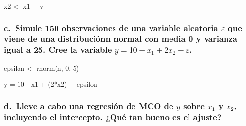 \documentclass[
]{article}
\newenvironment{Shaded}{\begin{snugshade}}{\end{snugshade}}
\newcommand{\DecValTok}[1]{\textcolor[rgb]{0.00,0.00,0.81}{#1}}
\newcommand{\FunctionTok}[1]{\textcolor[rgb]{0.00,0.00,0.00}{#1}}
\newcommand{\NormalTok}[1]{#1}
\newcommand{\OtherTok}[1]{\textcolor[rgb]{0.56,0.35,0.01}{#1}}
\newcommand{\SpecialCharTok}[1]{\textcolor[rgb]{0.00,0.00,0.00}{#1}}
\begin{document}
\begin{Shaded}
\begin{Highlighting}[]
\NormalTok{x2 }\OtherTok{\textless{}{-}}\NormalTok{ x1 }\SpecialCharTok{+}\NormalTok{ v}
\end{Highlighting}
\end{Shaded}

\hypertarget{c.-simule-150-observaciones-de-una-variable-aleatoria-varepsilon-que-viene-de-una-distribuciuxf3nn-normal-con-media-0-y-varianza-igual-a-25.-cree-la-variable-y-10-x_1-2x_2-varepsilon.}{%
\subsubsection{\texorpdfstring{c.~Simule 150 observaciones de una
variable aleatoria \(\varepsilon\) que viene de una distribuciónn normal
con media 0 y varianza igual a 25. Cree la variable
\(y = 10 − x_{1} + 2x_{2} + \varepsilon\).}{c.~Simule 150 observaciones de una variable aleatoria \textbackslash varepsilon que viene de una distribuciónn normal con media 0 y varianza igual a 25. Cree la variable y = 10 − x\_\{1\} + 2x\_\{2\} + \textbackslash varepsilon.}}\label{c.-simule-150-observaciones-de-una-variable-aleatoria-varepsilon-que-viene-de-una-distribuciuxf3nn-normal-con-media-0-y-varianza-igual-a-25.-cree-la-variable-y-10-x_1-2x_2-varepsilon.}}

\begin{Shaded}
\begin{Highlighting}[]
\NormalTok{epsilon }\OtherTok{\textless{}{-}} \FunctionTok{rnorm}\NormalTok{(n, }\DecValTok{0}\NormalTok{, }\DecValTok{5}\NormalTok{)}

\NormalTok{y }\OtherTok{=} \DecValTok{10} \SpecialCharTok{{-}}\NormalTok{ x1 }\SpecialCharTok{+}\NormalTok{ (}\DecValTok{2}\SpecialCharTok{*}\NormalTok{x2) }\SpecialCharTok{+}\NormalTok{ epsilon}
\end{Highlighting}
\end{Shaded}

\hypertarget{d.-lleve-a-cabo-una-regresiuxf3n-de-mco-de-y-sobre-x_1-y-x_2-incluyendo-el-intercepto.-quuxe9-tan-bueno-es-el-ajuste}{%
\subsubsection{\texorpdfstring{d.~Lleve a cabo una regresión de MCO de
\(y\) sobre \(x_{1}\) y \(x_{2}\), incluyendo el intercepto. ¿Qué tan
bueno es el
ajuste?}{d.~Lleve a cabo una regresión de MCO de y sobre x\_\{1\} y x\_\{2\}, incluyendo el intercepto. ¿Qué tan bueno es el ajuste?}}\label{d.-lleve-a-cabo-una-regresiuxf3n-de-mco-de-y-sobre-x_1-y-x_2-incluyendo-el-intercepto.-quuxe9-tan-bueno-es-el-ajuste}}
\end{document}
